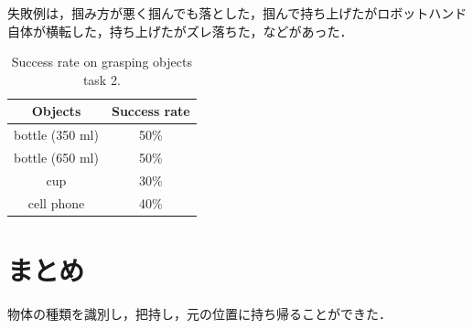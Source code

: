 失敗例は，掴み方が悪く掴んでも落とした，掴んで持ち上げたがロボットハンド自体が横転した，持ち上げたがズレ落ちた，などがあった．

\begin{table}[H]
    \centering
    \caption{Success rate on grasping objects task 2.}
    \begin{tabular}{cc}\toprule
        Objects & Success rate \\ \midrule
        bottle (350 ml) & 50\% \\ 
        bottle (650 ml) & 50\% \\ 
        cup & 30\% \\ 
        cell phone & 40\% \\ \bottomrule
    \end{tabular} 
    \label{tab:把持成功率2}
\end{table}



\section{まとめ}
物体の種類を識別し，把持し，元の位置に持ち帰ることができた．



